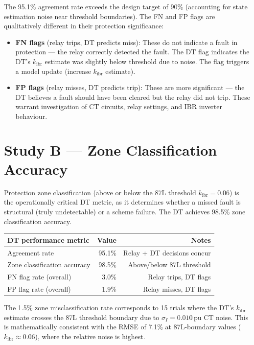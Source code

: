 \documentclass[11pt,a4paper]{article}
\begin{document}
\noindent
The 95.1\% agreement rate exceeds the design target of 90\% (accounting for
state estimation noise near threshold boundaries).  The FN and FP flags are
qualitatively different in their protection significance:
\begin{itemize}
  \item \textbf{FN flags} (relay trips, DT predicts miss): These do not
    indicate a fault in protection --- the relay correctly detected the fault.
    The DT flag indicates the DT's $k_\mathrm{ibr}$ estimate was slightly
    below threshold due to noise.  The flag triggers a model update (increase
    $k_\mathrm{ibr}$ estimate).

  \item \textbf{FP flags} (relay misses, DT predicts trip): These are more
    significant --- the DT believes a fault should have been cleared but the
    relay did not trip.  These warrant investigation of CT circuits, relay
    settings, and IBR inverter behaviour.
\end{itemize}

\section{Study B --- Zone Classification Accuracy}
\label{sec:studyB}

Protection zone classification (above or below the 87L threshold
$k_\mathrm{ibr}=0.06$) is the operationally critical DT metric, as it
determines whether a missed fault is structural (truly undetectable) or a
scheme failure.  The DT achieves 98.5\% zone classification accuracy.

\begin{center}
\begin{tabular}{@{}lrr@{}}
\toprule
DT performance metric & Value & Notes \\
\midrule
Agreement rate & 95.1\% & Relay + DT decisions concur \\
Zone classification accuracy & 98.5\% & Above/below 87L threshold \\
FN flag rate (overall) & 3.0\% & Relay trips, DT flags \\
FP flag rate (overall) & 1.9\% & Relay misses, DT flags \\
\bottomrule
\end{tabular}
\end{center}

\medskip\noindent
The 1.5\% zone misclassification rate corresponds to 15 trials where the DT's
$k_\mathrm{ibr}$ estimate crosses the 87L threshold boundary due to $\sigma_I =
0.010$\,pu CT noise.  This is mathematically consistent with the RMSE of 7.1\%
at 87L-boundary values ($k_\mathrm{ibr}\approx0.06$), where the relative noise
is highest.
\end{document}
